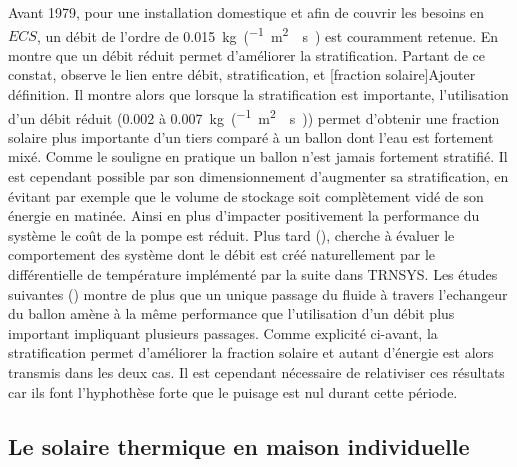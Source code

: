 




Avant 1979, pour une installation domestique et afin de couvrir les besoins
en $ECS$, un débit de l’ordre de \SI{0.015}{kg\per(\metre\squared\period\second)}
est couramment retenue. En  montre que un débit réduit
permet d’améliorer la stratification. Partant de ce constat, 
observe le lien entre débit, stratification, et [fraction solaire]{Ajouter définition}.
Il montre alors que lorsque la stratification est importante, l’utilisation d’un débit
réduit (\num{0.002} à \SI{0.007}{kg\per(\metre\squared\period\second)}) permet
d’obtenir une fraction solaire plus importante d’un tiers comparé à un ballon dont
l’eau est fortement mixé. Comme le souligne  en pratique
un ballon n’est jamais fortement stratifié. Il est cependant possible par son dimensionnement
d’augmenter sa stratification, en évitant par exemple que le volume de stockage soit
complètement vidé de son énergie en matinée. Ainsi en plus d’impacter positivement
la performance du système le coût de la pompe est réduit. Plus tard (),
cherche à évaluer le comportement des système dont le débit est créé naturellement
par le différentielle de température implémenté par la suite dans TRNSYS. Les études
suivantes () montre de plus que un unique
passage du fluide à travers l’echangeur du ballon amène à la même performance que
l’utilisation d’un débit plus important impliquant plusieurs passages. Comme explicité
ci-avant, la stratification permet d’améliorer la fraction solaire et autant d’énergie est
alors transmis dans les deux cas. Il est cependant nécessaire de relativiser ces
résultats car ils font l’hyphothèse forte que le puisage est nul durant cette période.



\subsection{Le solaire thermique en maison individuelle} %
\label{sub:le_solaire_thermique_en_maison_individuelle}
~




